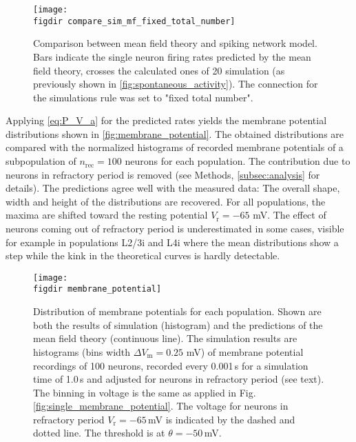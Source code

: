 \begin{figure}[tb]
    \centering
    \texttt{[image: \\figdir compare\_sim\_mf\_fixed\_total\_number]}
    \caption[Comparing mean field model to simulation]{
        Comparison between mean field theory and spiking network model. 
        Bars indicate the single neuron firing rates predicted by the mean field 
        theory, crosses the calculated ones of 20 simulation (as previously shown in
        \autoref{fig:spontaneous_activity}). The connection for the simulations
        rule was set to "fixed total number".
    }
    \label{fig:compare_sim_mf_fixed_total_number}
\end{figure}

Applying \autoref{eq:P_V_a} for the predicted rates yields the 
membrane potential distributions shown in 
\autoref{fig:membrane_potential}. 
The obtained distributions are compared with the normalized histograms of recorded 
membrane potentials of a subpopulation of $n_\text{rec} = 100$ neurons for 
each population. The contribution due to neurons in refractory period is removed
(see Methods, \autoref{subsec:analysis} for details). 
The predictions agree well with the measured data: The overall shape, width and 
height of the distributions are recovered. For all populations, the maxima are
shifted toward the resting potential $V_\text{r} = -65$ mV. 
The effect
of neurons coming out of refractory period is underestimated in some cases, 
visible for example in populations L2/3i and L4i where the mean distributions 
show a step while the kink in the theoretical curves is hardly detectable. 


\begin{figure}[tb]
    \centering
    \texttt{[image: \\figdir membrane\_potential]}
    \caption[Distribution of membrane potentials]{
        Distribution of membrane potentials for each population. 
        Shown are both the results of simulation (histogram) and 
        the predictions of the mean field theory (continuous line). 
        The simulation results are histograms (bins width $\Delta V_\text{m} = 0.25$ mV) 
        of membrane potential recordings 
        of 100 neurons, recorded every 0.001\,s for a simulation time of 1.0\,s 
        and adjusted for neurons in refractory period (see text). 
        The binning in voltage is the same as applied in Fig.~%
        \autoref{fig:single_membrane_potential}. 
        The voltage for neurons in refractory period $V_\text{r} = -65$\,mV 
        is indicated by the dashed and dotted line. The threshold is at 
        $\theta = -50$\,mV. 
    }
    \label{fig:membrane_potential}
\end{figure}

